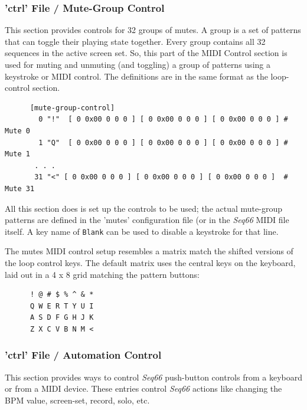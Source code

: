 \subsubsection{'ctrl' File / Mute-Group Control}
\label{subsubsec:configuration_ctrl_mute_group_control}

   This section provides controls for 32 groups of mutes.
   A group is a set of patterns that can toggle their playing state
   together.  Every group contains all 32 sequences in the active screen set.
   So, this part of the MIDI Control section is used for muting and unmuting
   (and toggling) a group of patterns using a keystroke or MIDI control.
   The definitions are in the same format as the loop-control section.

   \begin{verbatim}
      [mute-group-control]
        0 "!"  [ 0 0x00 0 0 0 ] [ 0 0x00 0 0 0 ] [ 0 0x00 0 0 0 ] # Mute 0
        1 "Q"  [ 0 0x00 0 0 0 ] [ 0 0x00 0 0 0 ] [ 0 0x00 0 0 0 ] # Mute 1
       . . .
       31 "<" [ 0 0x00 0 0 0 ] [ 0 0x00 0 0 0 ] [ 0 0x00 0 0 0 ]  # Mute 31
   \end{verbatim}

   All this section does is set up the controls to be used; the actual
   mute-group patterns are defined in the 'mutes' configuration file (or in the
   \textsl{Seq66} MIDI file itself.
   A key name of \texttt{Blank} can be used to disable a keystroke for
   that line.

   The mutes MIDI control setup resembles a matrix match the shifted versions
   of the loop control keys.  The default matrix
   uses the central keys on the keyboard, laid out in a 4 x 8 grid matching the
   pattern buttons:

   \begin{verbatim}
      ! @ # $ % ^ & *
      Q W E R T Y U I
      A S D F G H J K
      Z X C V B N M <
   \end{verbatim}

\subsubsection{'ctrl' File / Automation Control}
\label{subsubsec:configuration_midi_ctrl_automation}

   This section provides ways to control \textsl{Seq66} push-button controls
   from a keyboard or from a MIDI device.
   These entries control
   \textsl{Seq66} actions like changing the BPM value, screen-set,
   record, solo, etc.


